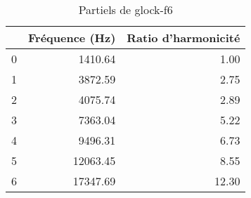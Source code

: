 \begin{table}
\centering
\caption{Partiels de glock-f6}
\label{table:partiels-glock-f6.wav}
\begin{tabular}{lrr}
\toprule
{} &  Fréquence (Hz) &  Ratio d'harmonicité \\
\midrule
0 &         1410.64 &                 1.00 \\
1 &         3872.59 &                 2.75 \\
2 &         4075.74 &                 2.89 \\
3 &         7363.04 &                 5.22 \\
4 &         9496.31 &                 6.73 \\
5 &        12063.45 &                 8.55 \\
6 &        17347.69 &                12.30 \\
\bottomrule
\end{tabular}
\end{table}
